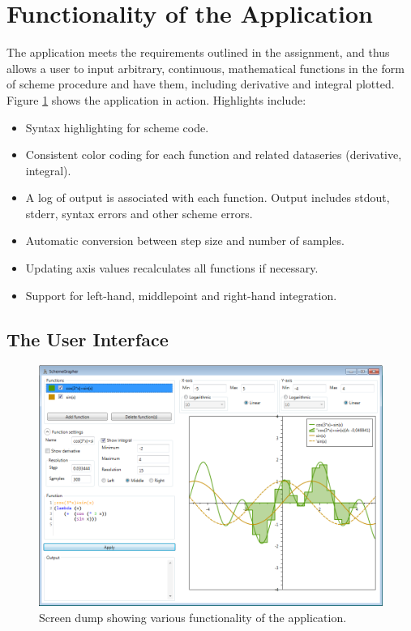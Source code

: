 \documentclass[a4paper,12pt]{article}
\begin{document}
\section{Functionality of the Application}

The application meets the requirements outlined in the assignment, and thus allows a user to input arbitrary, continuous, mathematical functions in the form of scheme procedure and have them, including derivative and integral plotted. Figure \ref{fig:screendump} shows the application in action. Highlights include:

\begin{itemize}
\item Syntax highlighting for scheme code.
\item Consistent color coding for each function and related dataseries (derivative, integral).
\item A log of output is associated with each function. Output includes stdout, stderr, syntax errors and other scheme errors.
\item Automatic conversion between step size and number of samples.
\item Updating axis values recalculates all functions if necessary.
\item Support for left-hand, middlepoint and right-hand integration.
\end{itemize}

\subsection{The User Interface}

\begin{figure}[h]
	\centering
	\includegraphics[scale=0.5]{schemegraphersscreen1}
	\caption{Screen dump showing various functionality of the application. }
    \label{fig:screendump}
\end{figure}
\end{document}
